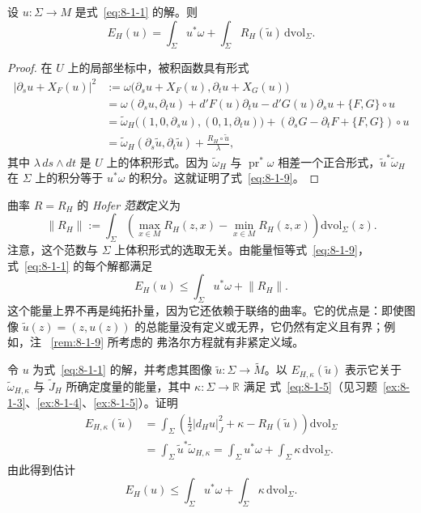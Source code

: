 \begin{lemma}\label{lem:8-1-6}
设 $u:\Sigma\to M$ 是式~\eqref{eq:8-1-1} 的解。则
\begin{equation}\label{eq:8-1-9}
  E_H(u)=\int_\Sigma u^*\omega
  +\int_\Sigma R_H(\widetilde u)\,\mathrm{dvol}_\Sigma.
\end{equation}
\end{lemma}

\begin{proof}
在 $U$ 上的局部坐标中，被积函数具有形式
\begin{align*}
  \lvert\partial_su+X_F(u)\rvert^2
  &:=\omega\bigl(\partial_su+X_F(u),\partial_tu+X_G(u)\bigr)\\
  &=\omega(\partial_su,\partial_tu)
    +d'F(u)\partial_tu-d'G(u)\partial_su+\{F,G\}\circ u\\
  &=\widetilde\omega_H\bigl((1,0,\partial_su),(0,1,\partial_tu)\bigr)
    +(\partial_sG-\partial_tF+\{F,G\})\circ u\\
  &=\widetilde\omega_H(\partial_s\widetilde u,\partial_t\widetilde u)
    +\frac{R_H\circ\widetilde u}{\lambda},
\end{align*}
其中 $\lambda\,ds\wedge dt$ 是 $U$ 上的体积形式。因为 $\widetilde\omega_H$ 与
$\operatorname{pr}^*\omega$ 相差一个正合形式，$\widetilde u^*\widetilde\omega_H$ 在
$\Sigma$ 上的积分等于 $u^*\omega$ 的积分。这就证明了式~\eqref{eq:8-1-9}。
\end{proof}

\begin{remark}\label{rem:8-1-7}
曲率 $R=R_H$ 的 \emph{Hofer 范数}定义为
\[
  \lVert R_H\rVert
  :=\int_\Sigma
  \left(\max_{x\in M}R_H(z,x)-\min_{x\in M}R_H(z,x)\right)
  \mathrm{dvol}_\Sigma(z).
\]
注意，这个范数与 $\Sigma$ 上体积形式的选取无关。由能量恒等式~\eqref{eq:8-1-9}，
式~\eqref{eq:8-1-1} 的每个解都满足
\[
  E_H(u)\le\int_\Sigma u^*\omega+\lVert R_H\rVert.
\]
这个能量上界不再是纯拓扑量，因为它还依赖于联络的曲率。它的优点是：即使图像
$\widetilde u(z)=(z,u(z))$ 的总能量没有定义或无界，它仍然有定义且有界；例如，注
~\ref{rem:8-1-9} 所考虑的 弗洛尔方程就有非紧定义域。
\end{remark}

\begin{exercise}\label{ex:8-1-8}
令 $u$ 为式~\eqref{eq:8-1-1} 的解，并考虑其图像
$\widetilde u:\Sigma\to\widetilde M$。以
$E_{H,\kappa}(\widetilde u)$ 表示它关于 $\widetilde\omega_{H,\kappa}$ 与
$\widetilde J_H$ 所确定度量的能量，其中 $\kappa:\Sigma\to\mathbb R$ 满足
式~\eqref{eq:8-1-5}（见习题~\ref{ex:8-1-3}、\ref{ex:8-1-4}、\ref{ex:8-1-5}）。证明
\begin{align*}
  E_{H,\kappa}(\widetilde u)
  &=\int_\Sigma
    \left(\frac12\lvert d_Hu\rvert_J^2+\kappa-R_H(\widetilde u)\right)
    \mathrm{dvol}_\Sigma\\
  &=\int_\Sigma\widetilde u^*\widetilde\omega_{H,\kappa}
   =\int_\Sigma u^*\omega+\int_\Sigma\kappa\,\mathrm{dvol}_\Sigma.
\end{align*}
由此得到估计
\[
  E_H(u)\le\int_\Sigma u^*\omega+\int_\Sigma\kappa\,\mathrm{dvol}_\Sigma.
\]
\end{exercise}

